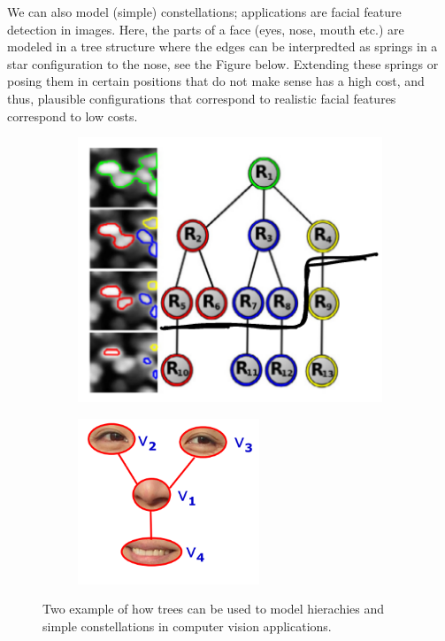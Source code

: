We can also model (simple) constellations; applications are facial
feature detection in images. Here, the parts of a face (eyes, nose,
mouth etc.) are modeled in a tree structure where the edges can be
interpredted as springs in a star configuration to the nose, see the
Figure below. Extending these springs or posing them in certain
positions that do not make sense has a high cost, and thus, plausible
configurations that correspond to realistic facial features correspond
to low costs.
\begin{figure}[htpb]
  \begin{subfigure}[c]{0.5\textwidth}
    \centering
    \includegraphics[width=0.7\linewidth]{Figures/tree-cells}
  \end{subfigure}%
  \begin{subfigure}[c]{0.5\textwidth}
    \centering
    \includegraphics[width=0.7\linewidth]{Figures/tree-face}
  \end{subfigure}
  \caption{Two example of how trees can be used to model hierachies
    and simple constellations in computer vision applications.}
\end{figure}

